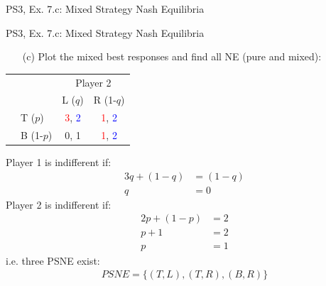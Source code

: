 \begin{frame}{PS3, Ex. 7.c: Mixed Strategy Nash Equilibria}
\begin{multicols}{2}
  \vfill\null
  \end{multicols}
\end{frame}
\begin{frame}{PS3, Ex. 7.c: Mixed Strategy Nash Equilibria}
  \begin{multicols}{2}
    \begin{itemize}
      \item[(c)] Plot the mixed best responses and find all NE (pure and mixed):
    \end{itemize}
    \begin{table}
      \begin{tabular}{cl|c|c|}
        & \multicolumn{1}{c}{} & \multicolumn{2}{c}{\color{blue}Player 2}\\
        \parbox[t]{1mm}{}
        &  &  &  \\
        & T  ($p$)  & \textcolor{red}{3}, \textcolor{blue}{2} & \textcolor{red}{1}, \textcolor{blue}{2} \\
        & B  (1-$p$)& 0, 1 & \textcolor{red}{1}, \textcolor{blue}{2} \\
      \end{tabular}
    \end{table}
    Player 1 is indifferent if:
    \begin{align*}
      3q+(1-q) &= (1-q) \\
      q &= 0
    \end{align*}
    Player 2 is indifferent if:
    \begin{align*}
      2p + (1-p) &= 2 \\
      p + 1      &= 2 \\
      p          &= 1
    \end{align*}
    i.e. three PSNE exist:
    \begin{align*}
      PSNE=\{(T,L),(T,R),(B,R)\}
    \end{align*}
  \vfill\null \columnbreak

\end{multicols}
\end{frame}
